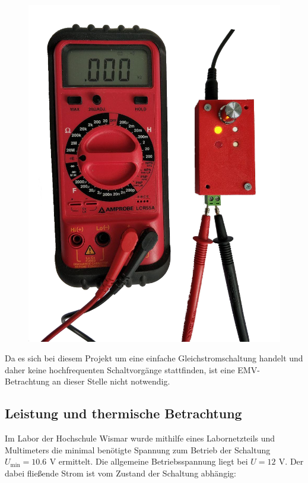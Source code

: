 \documentclass[a4paper, 12pt]{article}
\begin{document}
\begin{figure}[h!]
\begin{minipage}{.5\textwidth}
        \centering
        \includegraphics[width=.9\linewidth]{graphics/messi2.png}
        \label{fig:messi2}
      \end{minipage}
    \end{figure}

    Da es sich bei diesem Projekt um eine einfache Gleichstromschaltung handelt und daher keine hochfrequenten Schaltvorgänge stattfinden, ist eine EMV-Betrachtung an dieser Stelle nicht notwendig.

  \subsection{Leistung und thermische Betrachtung}
    Im Labor der Hochschule Wismar wurde mithilfe eines Labornetzteils und Multimeters die minimal benötigte Spannung zum Betrieb der Schaltung $U_{\text{min}} = 10.6 \,\ \si{\volt}$ ermittelt. Die allgemeine Betriebsspannung liegt bei $U = 12 \,\ \si{\volt}$. Der dabei fließende Strom ist vom Zustand der Schaltung abhängig:\\
\end{document}
